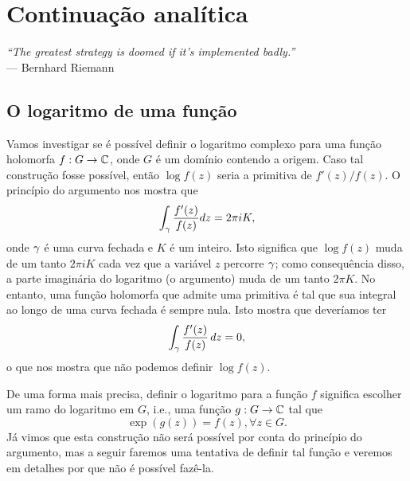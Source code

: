 \chapter[Continuação analítica]{Continuação analítica}
\chaptermark{}

\hfill%
\begin{minipage}{10cm}
    \begin{flushright}
    \rightskip=0.5cm
        \textit{``The greatest strategy is doomed if it's implemented badly.''}
        \\[0.1cm]
    \rightskip=0.5cm
    --- Bernhard Riemann
    \end{flushright}
\end{minipage}

\section{O logaritmo de uma função}

    Vamos investigar se é possível definir o logaritmo complexo para uma função holomorfa 
    $f: G \to \mathbb{C}$, onde $G$ é um domínio contendo a origem. Caso tal construção fosse possível,
    então $\log f(z)$ seria a primitiva de $f'(z)/f(z)$. O princípio do argumento nos mostra que
    \begin{equation*}
        \int_\gamma \frac{f'(z)}{f(z)} dz = 2\pi i K,
    \end{equation*}
    onde $\gamma$ é uma curva fechada e $K$ é um inteiro. Isto significa que $\log f(z)$ muda 
    de um tanto $2\pi i K$ cada vez que a variável $z$ percorre $\gamma$; como consequência disso,
    a parte imaginária do logaritmo (o argumento) muda de um tanto $2 \pi K$. No entanto, uma
    função holomorfa que admite uma primitiva é tal que sua integral ao longo de uma curva fechada
    é sempre nula. Isto mostra que deveríamos ter
    \begin{equation*}
        \int_\gamma \frac{f'(z)}{f(z)} \, dz = 0,
    \end{equation*}
    o que nos mostra que não podemos definir $\log f(z)$.
    
    De uma forma mais precisa, definir o logaritmo para a função $f$ significa escolher um ramo 
    do logaritmo em $G$, i.e., uma função $g: G \to \mathbb{C}$ tal que 
    \begin{equation*}
        \exp(g(z)) = f(z), \forall z \in G.  
    \end{equation*}
    Já vimos que esta construção não será possível por conta do princípio do argumento, mas a
    seguir faremos uma tentativa de definir tal função e veremos em detalhes por que não é 
    possível fazê-la.
    
